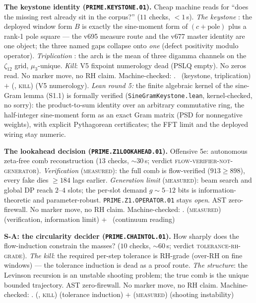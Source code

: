 \par\smallskip\noindent\textbf{The keystone identity
(\texttt{PRIME.KEYSTONE.01}).}
Cheap machine reads for ``does the missing rest already sit in the
corpus?'' ($11$ checks, ${<}1$\,s).  \emph{The keystone} \mE: the
deployed window form $B$ is exactly the sine-moment form of
$(c+\mathrm{pole})$ plus a rank-1 pole square --- the v695 measure
route and the v677 master identity are one object; the three named
gaps collapse onto \emph{one} (defect positivity modulo operator).
\emph{Triplication} \mE: the arch is the mean of three digamma
channels on the $\zeta_{12}$ grid, $\mu_3$-unique.  \emph{Kill}: V5
fixpoint numerology dead (PSLQ empty).  No zeros read.  No marker
move, no RH claim.
Machine-checked: .
\mE\ (keystone, triplication) $+$ (\mE, \textsc{kill}) (V5
numerology).
\emph{Lean round 5:} the finite algebraic kernel of the sine-Gram
lemma (S1.1) is formally verified
(\texttt{SineGramKeystone.lean}, kernel-checked, no sorry): the
product-to-sum identity over an arbitrary commutative ring, the
half-integer sine-moment form as an exact Gram matrix (PSD for
nonnegative weights), with explicit Pythagorean certificates; the
FFT limit and the deployed wiring stay numeric.
\par\smallskip


\par\smallskip\noindent\textbf{The lookahead decision
(\texttt{PRIME.Z1LOOKAHEAD.01}).}
Offensive 5e: autonomous zeta-free comb reconstruction ($13$ checks,
${\sim}30$\,s; verdict \textsc{flow-verifier-not-generator}).
\emph{Verification} (\textsc{measured}): the full comb is
flow-verified ($913\ge898$), every fake dies $\ge184$ lags earlier.
\emph{Generation limit} (\textsc{measured}): beam search and global
DP reach $2$--$4$ slots; the per-slot demand $g\sim5$--$12$ bits is
information-theoretic and parameter-robust.
\texttt{PRIME.Z1.OPERATOR.01} stays \emph{open}.  AST zero-firewall.
No marker move, no RH claim.
Machine-checked: .
(\textsc{measured}) (verification, information limit) $+$ \mO\
(continuum reading)
\par\smallskip


\par\smallskip\noindent\textbf{S-A: the circularity decider
(\texttt{PRIME.CHAINTOL.01}).}
How sharply does the flow-induction constrain the masses? ($10$
checks, ${\sim}60$\,s; verdict \textsc{tolerance-rh-grade}).
\emph{The kill}: the required per-step tolerance is RH-grade
(over-RH on fine windows) --- the tolerance induction is dead as a
proof route.  \emph{The structure}: the Levinson recursion is an
unstable shooting problem; the true comb is the unique bounded
trajectory.  AST zero-firewall.  No marker move, no RH claim.
Machine-checked: .
(\mE, \textsc{kill}) (tolerance induction) $+$ (\textsc{measured})
(shooting instability)
\par\smallskip


